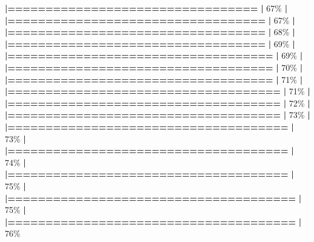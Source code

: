 \documentclass[
]{book}
\newenvironment{Shaded}{\begin{snugshade}}{\end{snugshade}}
\newcommand{\DecValTok}[1]{\textcolor[rgb]{0.00,0.00,0.81}{#1}}
\newcommand{\ErrorTok}[1]{\textcolor[rgb]{0.64,0.00,0.00}{\textbf{#1}}}
\newcommand{\NormalTok}[1]{#1}
\newcommand{\SpecialCharTok}[1]{\textcolor[rgb]{0.81,0.36,0.00}{\textbf{#1}}}
\begin{document}
\begin{Shaded}
\begin{Highlighting}[]
  \ErrorTok{|=================================}                 \ErrorTok{|}  \DecValTok{67}\NormalTok{\%}
  \SpecialCharTok{|}                                                        
  \ErrorTok{|==================================}                \ErrorTok{|}  \DecValTok{67}\NormalTok{\%}
  \SpecialCharTok{|}                                                        
  \ErrorTok{|==================================}                \ErrorTok{|}  \DecValTok{68}\NormalTok{\%}
  \SpecialCharTok{|}                                                        
  \ErrorTok{|==================================}                \ErrorTok{|}  \DecValTok{69}\NormalTok{\%}
  \SpecialCharTok{|}                                                        
  \ErrorTok{|===================================}               \ErrorTok{|}  \DecValTok{69}\NormalTok{\%}
  \SpecialCharTok{|}                                                        
  \ErrorTok{|===================================}               \ErrorTok{|}  \DecValTok{70}\NormalTok{\%}
  \SpecialCharTok{|}                                                        
  \ErrorTok{|===================================}               \ErrorTok{|}  \DecValTok{71}\NormalTok{\%}
  \SpecialCharTok{|}                                                        
  \ErrorTok{|====================================}              \ErrorTok{|}  \DecValTok{71}\NormalTok{\%}
  \SpecialCharTok{|}                                                        
  \ErrorTok{|====================================}              \ErrorTok{|}  \DecValTok{72}\NormalTok{\%}
  \SpecialCharTok{|}                                                        
  \ErrorTok{|====================================}              \ErrorTok{|}  \DecValTok{73}\NormalTok{\%}
  \SpecialCharTok{|}                                                        
  \ErrorTok{|=====================================}             \ErrorTok{|}  \DecValTok{73}\NormalTok{\%}
  \SpecialCharTok{|}                                                        
  \ErrorTok{|=====================================}             \ErrorTok{|}  \DecValTok{74}\NormalTok{\%}
  \SpecialCharTok{|}                                                        
  \ErrorTok{|=====================================}             \ErrorTok{|}  \DecValTok{75}\NormalTok{\%}
  \SpecialCharTok{|}                                                        
  \ErrorTok{|======================================}            \ErrorTok{|}  \DecValTok{75}\NormalTok{\%}
  \SpecialCharTok{|}                                                        
  \ErrorTok{|======================================}            \ErrorTok{|}  \DecValTok{76}\NormalTok{\%}

\end{Highlighting}
\end{Shaded}
\end{document}
